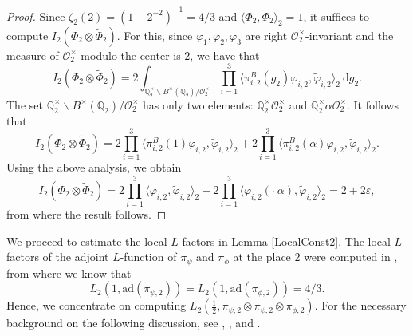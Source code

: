 \documentclass[11pt]{amsart}
\theoremstyle{definition}
\begin{document}
\begin{proof}
Since $\zeta_2(2) = (1-2^{-2})^{-1} = 4/3$ and $\langle \Phi_2, \widetilde{\Phi}_2\rangle_2 = 1$, it suffices to compute $I_2(\Phi_2\otimes \widetilde{\Phi}_2)$. For this, since $\varphi_1, \varphi_2, \varphi_3$ are right $\mathcal{O}_{2}^{\times}$-invariant and the measure of $\mathcal{O}_{2}^{\times}$ modulo the center is $2$, we have that $$ I_2(\Phi_2 \otimes \widetilde{\Phi}_2) = 2\int_{\mathbb{Q}_{2}^{\times} \backslash B^{\times}(\mathbb{Q}_2) / \mathcal{O}_{2}^{\times}} \prod_{i=1}^{3} \langle \pi_{i,2}^{B}(g_2) \varphi_{i,2}, \widetilde{\varphi}_{i,2}\rangle_{2} \: \mathrm{d}g_2.$$ The set $\mathbb{Q}_{2}^{\times} \backslash B^{\times}(\mathbb{Q}_2) / \mathcal{O}_{2}^{\times}$ has only two elements: $\mathbb{Q}_{2}^{\times} \mathcal{O}_{2}^{\times}$ and $\mathbb{Q}_{2}^{\times} \alpha \mathcal{O}_{2}^{\times}$. It follows that $$ I_2(\Phi_2 \otimes \widetilde{\Phi}_2) = 2\prod_{i=1}^{3} \langle \pi_{i,2}^{B}(1)\varphi_{i,2}, \widetilde{\varphi}_{i,2}\rangle_{2} + 2\prod_{i=1}^{3} \langle \pi_{i,2}^{B}(\alpha)\varphi_{i,2}, \widetilde{\varphi}_{i,2}\rangle_{2}.$$ Using the above analysis, we obtain $$ I_2(\Phi_2 \otimes \widetilde{\Phi}_2) = 2\prod_{i=1}^{3} \langle \varphi_{i,2}, \widetilde{\varphi}_{i,2}\rangle_{2} + 2\prod_{i=1}^{3} \langle \varphi_{i,2}(\cdot \: \alpha), \widetilde{\varphi}_{i,2}\rangle_{2} = 2 + 2\varepsilon,$$ from where the result follows.
\end{proof}

We proceed to estimate the local $L$-factors in Lemma \ref{LocalConst2}. The local $L$-factors of the adjoint $L$-function of $\pi_{\psi}$ and $\pi_{\phi}$ at the place $2$ were computed in \cite[\S 4.7]{garza2025geodesicrestrictionproblemarithmetic}, from where we know that $$L_2(1,\mathrm{ad}(\pi_{\psi,2})) = L_2(1,\mathrm{ad}(\pi_{\phi,2})) = 4/3.$$ Hence, we concentrate on computing $L_2(\frac{1}{2}, \pi_{\psi,2} \otimes \pi_{\psi,2} \otimes \pi_{\phi,2})$. For the necessary background on the following discussion, see \cite[\S 7]{localLanglandsGL2}, \cite[\S 1]{IntroLanglands}, and \cite{NTBTate}.
\end{document}
